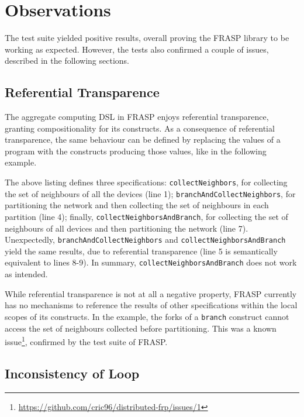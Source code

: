 
\section{Observations}
\label{section:verification:observations}

The test suite yielded positive results, overall proving the FRASP library to
be working as expected. However, the tests also confirmed a couple of issues,
described in the following sections.

\subsection{Referential Transparence}

The aggregate computing \ac{DSL} in FRASP enjoys referential transparence,
granting compositionality for its constructs. As a consequence of referential
transparence, the same behaviour can be defined by replacing the values of a
program with the constructs producing those values, like in the following
example.



The above listing defines three specifications: \texttt{collectNeighbors}, for
collecting the set of neighbours of all the devices (line 1);
\texttt{branchAndCollectNeighbors}, for partitioning the network and then
collecting the set of neighbours in each partition (line 4); finally,
\texttt{collectNeighborsAndBranch}, for collecting the set of neighbours of all
devices and then partitioning the network (line 7). Unexpectedly,
\texttt{branchAndCollectNeighbors} and \texttt{collectNeighborsAndBranch} yield
the same results, due to referential transparence (line 5 is semantically
equivalent to lines 8-9). In summary, \texttt{collectNeighborsAndBranch} does
not work as intended.

While referential transparence is not at all a negative property, FRASP
currently has no mechanisms to reference the results of other specifications
within the local scopes of its constructs. In the example, the forks of a
\texttt{branch} construct cannot access the set of neighbours collected before
partitioning. This was a known issue\footnote{
\url{https://github.com/cric96/distributed-frp/issues/1}}, confirmed by the
test suite of FRASP.

\subsection{Inconsistency of Loop}

